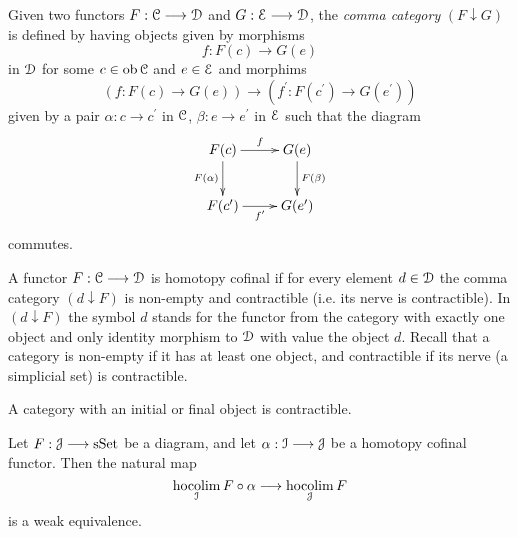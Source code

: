     \begin{defn}\label{def_comma_category}
      Given two functors $F:\mathcal{C} \longrightarrow \mathcal{D}$ and $G: \mathcal{E} \longrightarrow \mathcal{D}$, the \emph{comma category} $(F \downarrow G)$ is defined by having objects given by morphisms 
      \begin{displaymath}
        f \colon F(c) \to G(e)
      \end{displaymath}
      in $\mathcal{D}$ for some $c \in \operatorname{ob} \mathcal{C}$ and $e \in \mathcal{E}$ and morphims 
      \begin{displaymath}
        (f \colon F(c) \to G(e)) \to (f^\prime \colon F(c^\prime) \to G(e^\prime) )
      \end{displaymath}
      given by a pair $\alpha \colon c \to c^\prime$ in $\mathcal{C}$, $\beta \colon e \to e^\prime$ in $\mathcal{E}$ such that the diagram
      \begin{displaymath}
          \xymatrix{
            F(c)
              \ar[r]^{f}
              \ar[d]_{F(\alpha)}
            &
            G(e)
              \ar[d]^{F(\beta)}
            \\
            F(c^\prime) 
              \ar[r]_{f^\prime}
            &
            G(e^\prime)
          }
      \end{displaymath}
      commutes.
    \end{defn}
    \begin{defn}\label{def_homotopy_cofinal}
      A functor $F: \mathcal{C} \longrightarrow \mathcal{D}$ is homotopy cofinal if for every element $d \in \mathcal{D}$ the comma category $(d \downarrow F)$ is non-empty and contractible (i.e. its nerve is contractible).
      In $(d \downarrow F)$ the symbol $d$ stands for the functor from the category with exactly one object and only identity morphism to $\mathcal{D}$ with value the object $d$.
      Recall that a category is non-empty if it has at least one object, and contractible if its nerve (a simplicial set) is contractible.
    \end{defn}
    \begin{lem}\label{lem_category_contractible_if_has_initial_object}
      A category with an initial or final object is contractible.
    \end{lem}
    \begin{lem}\label{lem_homotopy_cofinal_functor_and_hocolim}
      Let $F: \mathcal{J} \longrightarrow \mathrm{sSet}$ be a diagram, and let $\alpha: \mathcal{I} \longrightarrow \mathcal{J}$ be a homotopy cofinal functor. Then the natural map
      \begin{displaymath}
        \operatorname*{hocolim}_{\mathcal{I}} F \circ \alpha \longrightarrow \operatorname*{hocolim}_{\mathcal{J}} F
      \end{displaymath}
      is a weak equivalence.
    \end{lem}
